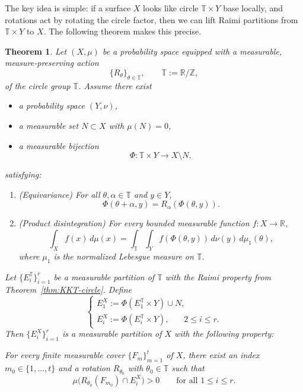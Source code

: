 \documentclass[11pt]{article}
\numberwithin{equation}{section}
\newtheorem{theorem}{Theorem}[section]
\theoremstyle{remark}
\begin{document}
The key idea is simple: if a surface $X$ looks like
circle $\mathbb{T} \times Y$ base locally, and rotations act by rotating the circle factor, then we can lift
Raimi partitions from $\mathbb{T} \times Y$ to $X$. The following theorem makes this precise.
\begin{theorem}\label{thm:general-circle-bundle}
Let $(X,\mu)$ be a probability space equipped with a measurable, measure-preserving action
\[
\{R_\theta\}_{\theta\in \mathbb{T}},\qquad \mathbb{T}:=\mathbb{R}/\mathbb{Z},
\]
of the circle group $\mathbb{T}$. Assume there exist
\begin{itemize}
    \item a probability space $(Y,\nu)$,
    \item a measurable set $N\subset X$ with $\mu(N)=0$,
    \item a measurable bijection
    \[
        \Phi : \mathbb{T} \times Y \longrightarrow X\setminus N,
    \]
\end{itemize}
satisfying:
\begin{enumerate}
    \item[(i)] (\emph{Equivariance}) For all $\theta,\alpha\in \mathbb{T}$ and $y\in Y$,
    \[
        \Phi(\theta+\alpha,y) = R_\alpha(\Phi(\theta,y)).
    \]
    \item[(ii)] (\emph{Product disintegration}) For every bounded measurable function $f:X\to\mathbb{R}$,
    \[
        \int_X f(x)\,d\mu(x)
        = \int_\mathbb{T} \int_Y f(\Phi(\theta,y))\,d\nu(y)\,d\mu_1(\theta),
    \]
    where $\mu_1$ is the normalized Lebesgue measure on $\mathbb{T}$.
\end{enumerate}
Let $\{E_i^\mathbb{T}\}_{i=1}^r$ be a measurable partition of $\mathbb{T}$ with the Raimi property from Theorem~\ref{thm:KKT-circle}. Define 
\begin{equation*}
    \begin{cases}
        E_1^X := \Phi(E_1^\mathbb{T}\times Y) \cup N,\\
        E_i^X:=\Phi(E_i^\mathbb{T}\times Y), ~~~~~~~~2 \leq i\leq r.
    \end{cases}
\end{equation*}
Then $\{E_i^X\}_{i=1}^r$ is a measurable partition of $X$ with the following property:

For every finite measurable cover $\{F_m\}_{m=1}^t$ of $X$, there exist an index $m_0\in\{1,\dots,t\}$ and a rotation $R_{\theta_0}$ with $\theta_0\in \mathbb{T}$ such that
\[
    \mu\big(R_{\theta_0}(F_{m_0})\cap E_i^X\big) > 0
    \qquad\text{for all } 1\le i\le r.
\]
\end{theorem}
\end{document}
